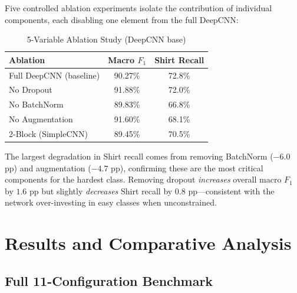 \documentclass[conference]{IEEEtran}
\begin{document}
Five controlled ablation experiments isolate the contribution of individual
components, each disabling one element from the full DeepCNN:

\begin{table}[h]
\centering
\caption{5-Variable Ablation Study (DeepCNN base)}
\label{tab:ablation}
\small
\begin{tabular}{lcc}
\toprule
\textbf{Ablation} & \textbf{Macro $F_1$} & \textbf{Shirt Recall} \\
\midrule
Full DeepCNN (baseline)   & 90.27\% & 72.8\% \\
No Dropout                & 91.88\% & 72.0\% \\
No BatchNorm              & 89.83\% & 66.8\% \\
No Augmentation           & 91.60\% & 68.1\% \\
2-Block (SimpleCNN)       & 89.45\% & 70.5\% \\
\bottomrule
\end{tabular}
\end{table}

The largest degradation in Shirt recall comes from removing BatchNorm
($-6.0$ pp) and augmentation ($-4.7$ pp), confirming these are the
most critical components for the hardest class. Removing dropout
\emph{increases} overall macro $F_1$ by $1.6$ pp but slightly
\emph{decreases} Shirt recall by $0.8$ pp---consistent with the network
over-investing in easy classes when unconstrained.

\section{Results and Comparative Analysis}\label{sec:results}

\subsection{Full 11-Configuration Benchmark}
\end{document}
